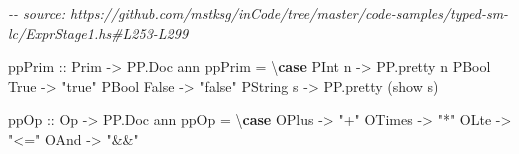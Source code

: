\documentclass[]{article}
\newenvironment{Shaded}{}{}
\newcommand{\CommentTok}[1]{\textcolor[rgb]{0.38,0.63,0.69}{\textit{#1}}}
\newcommand{\DataTypeTok}[1]{\textcolor[rgb]{0.56,0.13,0.00}{#1}}
\newcommand{\FunctionTok}[1]{\textcolor[rgb]{0.02,0.16,0.49}{#1}}
\newcommand{\KeywordTok}[1]{\textcolor[rgb]{0.00,0.44,0.13}{\textbf{#1}}}
\newcommand{\NormalTok}[1]{#1}
\newcommand{\OtherTok}[1]{\textcolor[rgb]{0.00,0.44,0.13}{#1}}
\newcommand{\StringTok}[1]{\textcolor[rgb]{0.25,0.44,0.63}{#1}}
\begin{document}
\begin{Shaded}
\begin{Highlighting}[]
\CommentTok{{-}{-} source: https://github.com/mstksg/inCode/tree/master/code{-}samples/typed{-}sm{-}lc/ExprStage1.hs\#L253{-}L299}

\OtherTok{ppPrim ::} \DataTypeTok{Prim} \OtherTok{{-}\textgreater{}} \DataTypeTok{PP.Doc}\NormalTok{ ann}
\NormalTok{ppPrim }\OtherTok{=}\NormalTok{ \textbackslash{}}\KeywordTok{case}
  \DataTypeTok{PInt}\NormalTok{ n }\OtherTok{{-}\textgreater{}}\NormalTok{ PP.pretty n}
  \DataTypeTok{PBool} \DataTypeTok{True} \OtherTok{{-}\textgreater{}} \StringTok{"true"}
  \DataTypeTok{PBool} \DataTypeTok{False} \OtherTok{{-}\textgreater{}} \StringTok{"false"}
  \DataTypeTok{PString}\NormalTok{ s }\OtherTok{{-}\textgreater{}}\NormalTok{ PP.pretty (}\FunctionTok{show}\NormalTok{ s)}

\OtherTok{ppOp ::} \DataTypeTok{Op} \OtherTok{{-}\textgreater{}} \DataTypeTok{PP.Doc}\NormalTok{ ann}
\NormalTok{ppOp }\OtherTok{=}\NormalTok{ \textbackslash{}}\KeywordTok{case}
  \DataTypeTok{OPlus} \OtherTok{{-}\textgreater{}} \StringTok{"+"}
  \DataTypeTok{OTimes} \OtherTok{{-}\textgreater{}} \StringTok{"*"}
  \DataTypeTok{OLte} \OtherTok{{-}\textgreater{}} \StringTok{"\textless{}="}
  \DataTypeTok{OAnd} \OtherTok{{-}\textgreater{}} \StringTok{"\&\&"}


\end{Highlighting}
\end{Shaded}
\end{document}
